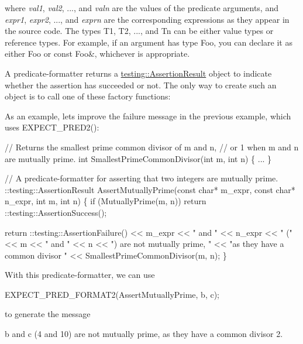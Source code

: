 where {\itshape val1}, {\itshape val2}, ..., and {\itshape valn} are the values of the predicate arguments, and {\itshape expr1}, {\itshape expr2}, ..., and {\itshape exprn} are the corresponding expressions as they appear in the source code. The types {\ttfamily T1}, {\ttfamily T2}, ..., and {\ttfamily Tn} can be either value types or reference types. For example, if an argument has type {\ttfamily Foo}, you can declare it as either {\ttfamily Foo} or {\ttfamily const Foo\&}, whichever is appropriate.

A predicate-\/formatter returns a {\ttfamily \mbox{\hyperlink{classtesting_1_1_assertion_result}{testing\+::\+Assertion\+Result}}} object to indicate whether the assertion has succeeded or not. The only way to create such an object is to call one of these factory functions\+:

As an example, let\textquotesingle{}s improve the failure message in the previous example, which uses {\ttfamily E\+X\+P\+E\+C\+T\+\_\+\+P\+R\+E\+D2()}\+:


\begin{DoxyCode}
// Returns the smallest prime common divisor of m and n,
// or 1 when m and n are mutually prime.
int SmallestPrimeCommonDivisor(int m, int n) \{ ... \}

// A predicate-formatter for asserting that two integers are mutually prime.
::testing::AssertionResult AssertMutuallyPrime(const char* m\_expr,
                                               const char* n\_expr,
                                               int m,
                                               int n) \{
  if (MutuallyPrime(m, n))
    return ::testing::AssertionSuccess();

  return ::testing::AssertionFailure()
      << m\_expr << " and " << n\_expr << " (" << m << " and " << n
      << ") are not mutually prime, " << "as they have a common divisor "
      << SmallestPrimeCommonDivisor(m, n);
\}
\end{DoxyCode}


With this predicate-\/formatter, we can use


\begin{DoxyCode}
EXPECT\_PRED\_FORMAT2(AssertMutuallyPrime, b, c);
\end{DoxyCode}


to generate the message


\begin{DoxyPre}
b and c (4 and 10) are not mutually prime, as they have a common divisor 2.~\newline

\end{DoxyPre}


